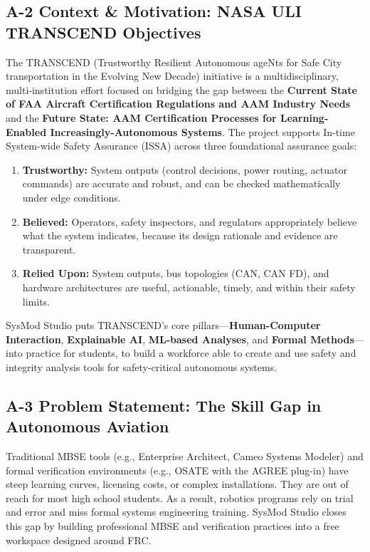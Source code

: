 \documentclass[11pt,letterpaper]{article}
\begin{document}
\subsection*{\normalsize {A-2 Context \& Motivation: NASA ULI TRANSCEND Objectives}}\label{sec:A2}
The TRANSCEND (Trustworthy Resilient Autonomous ageNts for Safe City transportation in the Evolving New Decade) initiative is a multidisciplinary, multi-institution effort focused on bridging the gap between the \textbf{Current State of FAA Aircraft Certification Regulations and AAM Industry Needs} and the \textbf{Future State: AAM Certification Processes for Learning-Enabled Increasingly-Autonomous Systems}. The project supports In-time System-wide Safety Assurance (ISSA) across three foundational assurance goals:

\begin{enumerate}[label=\textbf{\arabic*.}]
    \item \textbf{Trustworthy:} System outputs (control decisions, power routing, actuator commands) are accurate and robust, and can be checked mathematically under edge conditions.
    \item \textbf{Believed:} Operators, safety inspectors, and regulators appropriately believe what the system indicates, because its design rationale and evidence are transparent.
    \item \textbf{Relied Upon:} System outputs, bus topologies (CAN, CAN FD), and hardware architectures are useful, actionable, timely, and within their safety limits.
\end{enumerate}

SysMod Studio puts TRANSCEND's core pillars---\textbf{Human-Computer Interaction}, \textbf{Explainable AI}, \textbf{ML-based Analyses}, and \textbf{Formal Methods}---into practice for students, to build a workforce able to create and use safety and integrity analysis tools for safety-critical autonomous systems.

\subsection*{\normalsize {A-3 Problem Statement: The Skill Gap in Autonomous Aviation}}\label{sec:A3}
Traditional MBSE tools (e.g., Enterprise Architect, Cameo Systems Modeler) and formal verification environments (e.g., OSATE with the AGREE plug-in) have steep learning curves, licensing costs, or complex installations. They are out of reach for most high school students. As a result, robotics programs rely on trial and error and miss formal systems engineering training. SysMod Studio closes this gap by building professional MBSE and verification practices into a free workspace designed around FRC.
\end{document}
